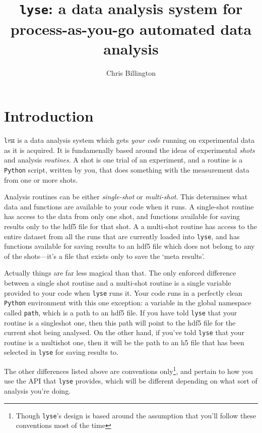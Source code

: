 \documentclass[a4paper,11pt,titlepage]{article}
\begin{document}
\title{\texttt{lyse}: a data analysis system for process-as-you-go automated data analysis}
\author{Chris Billington}
\maketitle
\tableofcontents
\section{Introduction}\label{sec:concepts}

\lettrine[lines=3]{\texttt{l}}{\texttt{yse}} is a data analysis system which gets \emph{your code } running on experimental data as it is acquired. It is fundamenally based around the ideas of experimental \emph{shots} and analysis \emph{routines}. A shot is one trial of an experiment, and a routine is a \texttt{Python} script, written by you, that does something with the measurement data from one or more shots.

Analysis routines can be either \emph{single-shot} or \emph{multi-shot}. This determines what data and functions are available to your code when it runs. A single-shot routine has access to the data from only one shot, and functions available for saving results only to the hdf5 file for that shot. A a multi-shot routine has access to the entire dataset from all the runs that are currently loaded into \texttt{lyse}, and has functions available for saving results to an hdf5 file which does not belong to any of the shots---it's a file that exists only to save the `meta results'.

Actually things are far less magical than that. The only enforced difference between a single shot routine and a multi-shot routine is a single variable provided to your code when \texttt{lyse} runs it. Your code runs in a perfectly clean \texttt{Python} environment with this one exception: a variable in the global namespace called \texttt{path}, which is a path to an hdf5 file. If you have told \texttt{lyse} that your routine is a singleshot one, then this path will point to the hdf5 file for the current shot being analysed. On the other hand, if you've told \texttt{lyse} that your routine is a multishot one, then it will be the path to an h5 file that has been selected in \texttt{lyse} for saving results to.

The other differences listed above are conventions only\footnote{Though \texttt{lyse}'s design is based around the assumption that you'll follow these conventions most of the time}, and pertain to how you use the API that \texttt{lyse} provides, which will be different depending on what sort of analysis you're doing.
\end{document}

